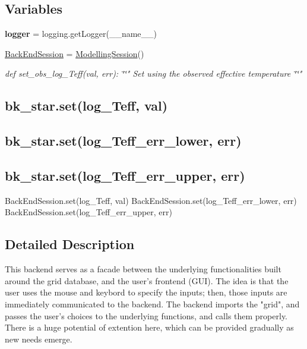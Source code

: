 \subsection*{Variables}
\begin{DoxyCompactItemize}
\item 
\mbox{\label{namespaceasamba_1_1backend_adc477dafe7d63a619926e80ee1ce7d07}} 
{\bfseries logger} = logging.\+get\+Logger(\+\_\+\+\_\+name\+\_\+\+\_\+)
\item 
\hyperlink{namespaceasamba_1_1backend_afd7e436e1e620c4ee06153ef5817ad7e}{Back\+End\+Session} = \hyperlink{classasamba_1_1backend_1_1_modelling_session}{Modelling\+Session}()
\begin{DoxyCompactList}\small\item\em def set\+\_\+obs\+\_\+log\+\_\+\+Teff(val, err)\+: \char`\"{}\char`\"{}" Set using the observed effective temperature \char`\"{}\char`\"{}" \subsection*{bk\+\_\+star.\+set(\textquotesingle{}log\+\_\+\+Teff\textquotesingle{}, val)}

\subsection*{bk\+\_\+star.\+set(\textquotesingle{}log\+\_\+\+Teff\+\_\+err\+\_\+lower\textquotesingle{}, err)}

\subsection*{bk\+\_\+star.\+set(\textquotesingle{}log\+\_\+\+Teff\+\_\+err\+\_\+upper\textquotesingle{}, err)}

Back\+End\+Session.\+set(\textquotesingle{}log\+\_\+\+Teff\textquotesingle{}, val) Back\+End\+Session.\+set(\textquotesingle{}log\+\_\+\+Teff\+\_\+err\+\_\+lower\textquotesingle{}, err) Back\+End\+Session.\+set(\textquotesingle{}log\+\_\+\+Teff\+\_\+err\+\_\+upper\textquotesingle{}, err) \end{DoxyCompactList}\end{DoxyCompactItemize}


\subsection{Detailed Description}
\begin{DoxyVerb}This backend serves as a facade between the underlying functionalities built around the grid database, 
and the user's frontend (GUI). The idea is that the user uses the mouse and keybord to specify the inputs;
then, those inputs are immediately communicated to the backend. The backend imports the "grid", and passes
the user's choices to the underlying functions, and calls them properly. There is a huge potential of 
extention here, which can be provided gradually as new needs emerge.
\end{DoxyVerb}
 

